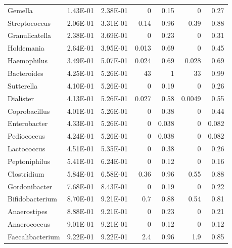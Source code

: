 {\begin{longtable}{ | l | r | r | r | r | r | r  | }
Gemella & 1.43E-01 & 2.38E-01 & 0 & 0.15 & 0 & 0.27 \\ 
Streptococcus & 2.06E-01 & 3.31E-01 & 0.14 & 0.96 & 0.39 & 0.88 \\ 
Granulicatella & 2.38E-01 & 3.69E-01 & 0 & 0.23 & 0 & 0.31 \\ 
Holdemania & 2.64E-01 & 3.95E-01 & 0.013 & 0.69 & 0 & 0.45 \\ 
Haemophilus & 3.49E-01 & 5.07E-01 & 0.024 & 0.69 & 0.028 & 0.69 \\ 
Bacteroides & 4.25E-01 & 5.26E-01 & 43 & 1 & 33 & 0.99 \\ 
Sutterella & 4.10E-01 & 5.26E-01 & 0 & 0.19 & 0 & 0.26 \\ 
Dialister & 4.13E-01 & 5.26E-01 & 0.027 & 0.58 & 0.0049 & 0.55 \\ 
Coprobacillus & 4.01E-01 & 5.26E-01 & 0 & 0.38 & 0 & 0.44 \\ 
Enterobacter & 4.33E-01 & 5.26E-01 & 0 & 0.038 & 0 & 0.082 \\ 
Pediococcus & 4.24E-01 & 5.26E-01 & 0 & 0.038 & 0 & 0.082 \\ 
Lactococcus & 4.51E-01 & 5.35E-01 & 0 & 0.38 & 0 & 0.26 \\ 
Peptoniphilus & 5.41E-01 & 6.24E-01 & 0 & 0.12 & 0 & 0.16 \\ 
Clostridium & 5.84E-01 & 6.58E-01 & 0.36 & 0.96 & 0.55 & 0.88 \\ 
Gordonibacter & 7.68E-01 & 8.43E-01 & 0 & 0.19 & 0 & 0.22 \\ 
Bifidobacterium & 8.70E-01 & 9.21E-01 & 0.7 & 0.88 & 0.54 & 0.81 \\ 
Anaerostipes & 8.88E-01 & 9.21E-01 & 0 & 0.23 & 0 & 0.21 \\ 
Anaerococcus & 9.01E-01 & 9.21E-01 & 0 & 0.12 & 0 & 0.12 \\ 
Faecalibacterium & 9.22E-01 & 9.22E-01 & 2.4 & 0.96 & 1.9 & 0.85

\end{longtable}
}






